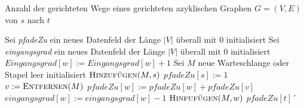 
\begin{solution}
	\begin{algorithm}
		\caption{Anzahl der gerichteten Wege eines gerichteten azyklischen Graphen $G = (V, E)$ von $s$ nach $t$}
		\begin{algorithmic}[1]
			\State Sei \textit{pfadeZu} ein neues Datenfeld der Länge $|V|$ überall mit $0$ initialisiert
			\State Sei \textit{eingangsgrad} ein neues Datenfeld der Länge $|V|$ überall mit $0$ initialisiert
				\State $\textit{Eingangsgrad}[w] := \textit{Eingangsgrad}[w] + 1$
			\EndFor
			\State Sei $M$ neue Warteschlange oder Stapel leer initialisiert
			\State $\textsc{Hinzufügen}(M,s)$
			\State $\textit{pfadeZu}[s] := 1$
				\State $v := \textsc{Entfernen}(M)$
					\State $\textit{pfadeZu}[w] := \textit{pfadeZu}[w] + \textit{pfadeZu}[v]$
					\State $\textit{eingangsgrad}[w] := \textit{eingangsgrad}[w] - 1$
						\State $\textsc{Hinfufügen}(M,w)$
					\EndIf
				\EndFor
			\EndWhile
			\Return $\textit{pfadeZu}[t]$´
			\EndProcedure
		\end{algorithmic}
	\end{algorithm}
\end{solution}